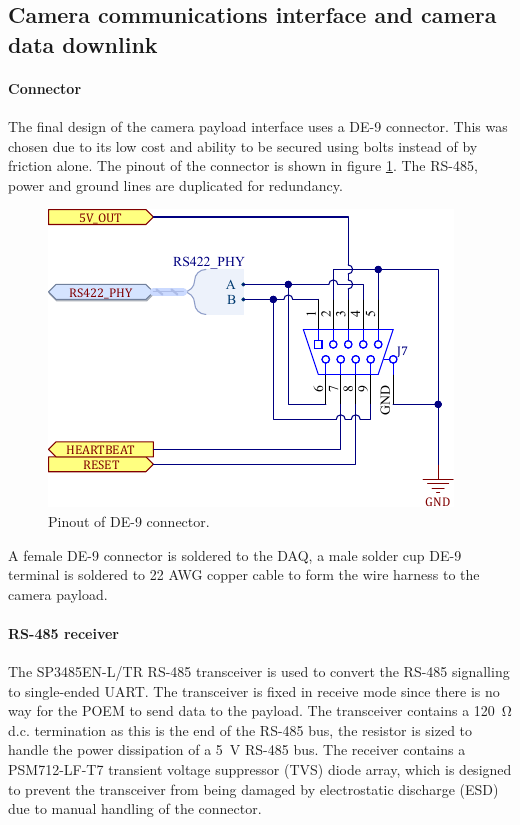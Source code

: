 \documentclass[draft]{report}
\begin{document}
\subsection{Camera communications interface and camera data downlink}

\paragraph{Connector}
The final design of the camera payload interface uses a DE-9 connector. This was chosen due to its low cost and ability to be secured using bolts instead of by friction alone. The pinout of the connector is shown in figure \ref{fig:de-9-connector}. The RS-485, power and ground lines are duplicated for redundancy.

\begin{figure}[H]
  \centering
  \includegraphics[width=\linewidth]{images/de-9-connector.pdf}
  \caption{Pinout of DE-9 connector.}
  \label{fig:de-9-connector}
\end{figure}

A female DE-9 connector is soldered to the DAQ, a male solder cup DE-9 terminal is soldered to 22 AWG copper cable to form the wire harness to the camera payload.

\paragraph{RS-485 receiver}
The SP3485EN-L/TR RS-485 transceiver is used to convert the RS-485 signalling to single-ended UART. The transceiver is fixed in receive mode since there is no way for the POEM to send data to the payload. The transceiver contains a \SI{120}{\ohm} d.c. termination as this is the end of the RS-485 bus, the resistor is sized to handle the power dissipation of a \SI{5}{\volt} RS-485 bus. The receiver contains a PSM712-LF-T7 transient voltage suppressor (TVS) diode array, which is designed to prevent the transceiver from being damaged by electrostatic discharge (ESD) due to manual handling of the connector.
\end{document}
